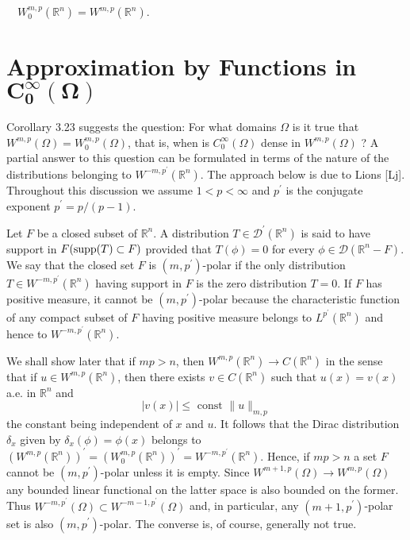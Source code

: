 \begin{corollary}
  $\quad W_0^{m, p}\left(\mathbb{R}^n\right)=W^{m,p}\left(\mathbb{R}^n\right)$.
\end{corollary}


\section[Approximation by Functions in $C_0^\infty (\Omega)$]%
  {Approximation by Functions in $\bm{C_0^\infty (\Omega)}$}


\begin{para}
  Corollary 3.23 suggests the question: For what domains $\Omega$ is it true
  that $W^{m,p}(\Omega)=W_0^{m, p}(\Omega)$, that is, when is $C_0^{\infty}(\Omega)$
  dense in $W^{m,p}(\Omega)$ ? A partial answer to this question can be formulated in terms of 
  the nature of the distributions belonging to $W^{-m, p^{\prime}}\left(\mathbb{R}^n\right)$.
  The approach below is due to Lions [Lj]. Throughout this discussion we assume $1<p<\infty$
  and $p^{\prime}$ is the conjugate exponent $p^{\prime}=p /(p-1)$.
\end{para}

\begin{para}
  Let $F$ be a closed subset of $\mathbb{R}^n$.
  A distribution $T \in \mathscr{D}^{\prime}\left(\mathbb{R}^n\right)$ is said to have support
  in $F(\operatorname{supp}(T) \subset F)$ provided that $T(\phi)=0$ for every
  $\phi \in \mathscr{D}\left(\mathbb{R}^n-F\right)$.
  We say that the closed set $F$ is $\left(m, p^{\prime}\right)$-polar if the only
  distribution $T \in W^{-m, p^{\prime}}\left(\mathbb{R}^n\right)$ having support in $F$ is
  the zero distribution $T=0$. If $F$ has positive measure,
  it cannot be $\left(m, p^{\prime}\right)$-polar because the characteristic function of any 
  compact subset of $F$ having positive measure belongs
  to $L^{p^{\prime}}\left(\mathbb{R}^n\right)$ and hence
  to $W^{-m, p^{\prime}}\left(\mathbb{R}^n\right)$.
\end{para}

We shall show later that if $m p>n$,
then $W^{m,p}\left(\mathbb{R}^n\right) \rightarrow C\left(\mathbb{R}^n\right)$ in the sense that 
if $u \in W^{m,p}\left(\mathbb{R}^n\right)$, then there exists $v \in C\left(\mathbb{R}^n\right)$ 
such that $u(x)=v(x)$ a.e. in $\mathbb{R}^n$ and
\[
|v(x)| \leq \text { const }\|u\|_{m,p}
\]
the constant being independent of $x$ and $u$. It follows that the Dirac distribution $\delta_x$ 
given by $\delta_x(\phi)=\phi(x)$ belongs to
$\left(W^{m,p}\left(\mathbb{R}^n\right)\right)^{\prime}=\left(W_0^{m, p}\left(\mathbb{R}^n\right)\right)^{\prime}=W^{-m, p^{\prime}}\left(\mathbb{R}^n\right)$.
Hence, if $m p>n$ a set $F$ cannot be $\left(m, p^{\prime}\right)$-polar unless it is empty.
Since $W^{m+1, p}(\Omega) \rightarrow W^{m,p}(\Omega)$ any bounded linear functional on the 
latter space is also bounded on the former.
Thus $W^{-m, p^{\prime}}(\Omega) \subset W^{-m-1, p^{\prime}}(\Omega)$ and, in particular,
any $\left(m+1, p^{\prime}\right)$-polar set is also $\left(m, p^{\prime}\right)$-polar.
The converse is, of course, generally not true.


